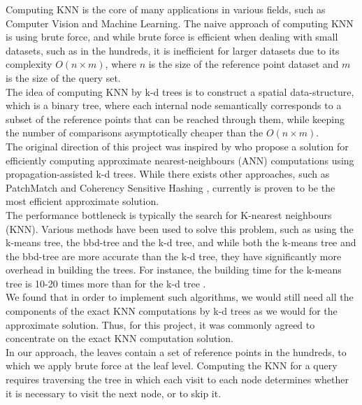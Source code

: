 Computing KNN is the core of many applications in various fields, such as Computer Vision and Machine Learning. %
The naive approach of computing KNN is using brute force, and while brute force is efficient when dealing with small datasets, such as in the hundreds, it is inefficient for larger datasets due to its complexity $O(n \times m)$, where $n$ is the size of the reference point dataset and $m$ is the size of the query set. 
\\[2mm]
The idea of computing KNN by k-d trees is to construct a spatial data-structure, which is a binary tree, where each internal node semantically corresponds to a subset of the reference points that can be reached through them, while keeping the number of comparisons asymptotically cheaper than the $O(n \times m)$.
\\[2mm]
The original direction of this project was inspired by \cite{kdann} who propose a solution for efficiently computing approximate nearest-neighbours (ANN) computations using propagation-assisted k-d trees. While there exists other approaches, such as PatchMatch \cite{patchmatch} and Coherency Sensitive Hashing \cite{hash}, currently \cite{kdann} is proven to be the most efficient approximate solution. 
\\[2mm]
The performance bottleneck is typically the search for K-nearest neighbours (KNN). Various methods have been used to solve this problem, such as using the k-means tree, the bbd-tree and the k-d tree, and while both the k-means tree and the bbd-tree are more accurate than the k-d tree, they have significantly more overhead in building the trees. For instance, the building time for the k-means tree is 10-20 times more than for the k-d tree \cite{kdann}.
\\[2mm]
We found that in order to implement such algorithms, we would still need all the components of the exact KNN computations by k-d trees as we would for the approximate solution. Thus, for this project, it was commonly agreed to concentrate on the exact KNN computation solution. 
\\[2mm]
In our approach, the leaves contain a set of reference points in the hundreds, to which we apply brute force at the leaf level.  
Computing the KNN for a query requires traversing the tree in which each visit to each node determines whether it is necessary to visit the next node, or to skip it. 
